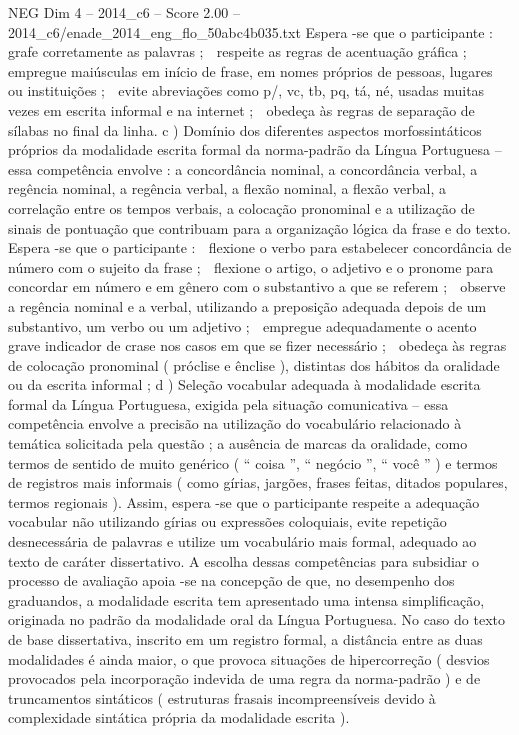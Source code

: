 \begin{textsample}{NEG Dim 4 – 2014\_c6 – Score 2.00 – 2014\_c6/enade\_2014\_eng\_flo\_50abc4b035.txt}
Espera -se que o participante :  grafe corretamente as palavras ;  respeite as regras de acentuação gráfica ;  empregue maiúsculas em início de frase, em nomes próprios de pessoas, lugares ou instituições ;  evite abreviações como p/, vc, tb, pq, tá, né, usadas muitas vezes em escrita informal e na internet ;  obedeça às regras de separação de sílabas no final da linha. c ) Domínio dos diferentes aspectos morfossintáticos próprios da modalidade escrita formal da norma-padrão da Língua Portuguesa – essa competência envolve : a concordância nominal, a concordância verbal, a regência nominal, a regência verbal, a flexão nominal, a flexão verbal, a correlação entre os tempos verbais, a colocação pronominal e a utilização de sinais de pontuação que contribuam para a organização lógica da frase e do texto.
Espera -se que o participante :  flexione o verbo para estabelecer concordância de número com o sujeito da frase ;  flexione o artigo, o adjetivo e o pronome para concordar em número e em gênero com o substantivo a que se referem ;  observe a regência nominal e a verbal, utilizando a preposição adequada depois de um substantivo, um verbo ou um adjetivo ;  empregue adequadamente o acento grave indicador de crase nos casos em que se fizer necessário ;  obedeça às regras de colocação pronominal ( próclise e ênclise ), distintas dos hábitos da oralidade ou da escrita informal ; d ) Seleção vocabular adequada à modalidade escrita formal da Língua Portuguesa, exigida pela situação comunicativa – essa competência envolve a precisão na utilização do vocabulário relacionado à temática solicitada pela questão ; a ausência de marcas da oralidade, como termos de sentido de muito genérico ( “ coisa ”, “ negócio ”, “ você ” ) e termos de registros mais informais ( como gírias, jargões, frases feitas, ditados populares, termos regionais ).
Assim, espera -se que o participante respeite a adequação vocabular não utilizando gírias ou expressões coloquiais, evite repetição desnecessária de palavras e utilize um vocabulário mais formal, adequado ao texto de caráter dissertativo.
A escolha dessas competências para subsidiar o processo de avaliação apoia -se na concepção de que, no desempenho dos graduandos, a modalidade escrita tem apresentado uma intensa simplificação, originada no padrão da modalidade oral da Língua Portuguesa.
No caso do texto de base dissertativa, inscrito em um registro formal, a distância entre as duas modalidades é ainda maior, o que provoca situações de hipercorreção ( desvios provocados pela incorporação indevida de uma regra da norma-padrão ) e de truncamentos sintáticos ( estruturas frasais incompreensíveis devido à complexidade sintática própria da modalidade escrita ).

\end{textsample}
